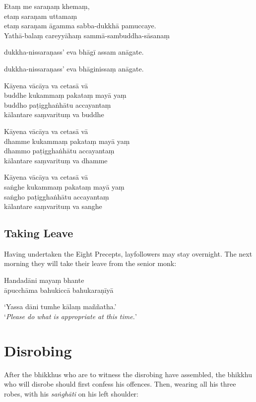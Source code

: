 Etaṃ me saraṇaṃ khemaṃ,\\
etaṃ saraṇam uttamaṃ\\
etaṃ saraṇam āgamma sabba-dukkhā pamuccaye.\\
Yathā-balaṃ careyyāhaṃ sammā-sambuddha-sāsanaṃ

%
dukkha-nissaraṇass' eva bhāgī assam anāgate.

%
dukkha-nissaraṇass' eva bhāginissaṃ anāgate.

Kāyena vācāya va cetasā vā\\
buddhe kukammaṃ pakataṃ mayā yaṃ\\
buddho paṭigghaṅhātu accayantaṃ\\
kālantare saṃvarituṃ va buddhe

Kāyena vācāya va cetasā vā\\
dhamme kukammaṃ pakataṃ mayā yaṃ\\
dhammo paṭigghaṅhātu accayantaṃ\\
kālantare saṃvarituṃ va dhamme

Kāyena vācāya va cetasā vā\\
saṅghe kukammaṃ pakataṃ mayā yaṃ\\
saṅgho paṭigghaṅhātu accayantaṃ\\
kālantare saṃvarituṃ va sanghe

\subsection{Taking Leave}

Having undertaken the Eight Precepts, layfollowers may stay overnight. The next
morning they will take their leave from the senior monk:


Handadāni mayaṃ bhante\\
āpucchāma bahukiccā bahukaraṇīyā


‘Yassa dāni tumhe kālaṃ maññatha.’\\
‘\emph{Please do what is appropriate at this time.}’

\section{Disrobing}

After the bhikkhus who are to witness the disrobing have assembled, the bhikkhu
who will disrobe should first confess his offences. Then, wearing all his three
robes, with his \emph{saṅghāti} on his left shoulder:

